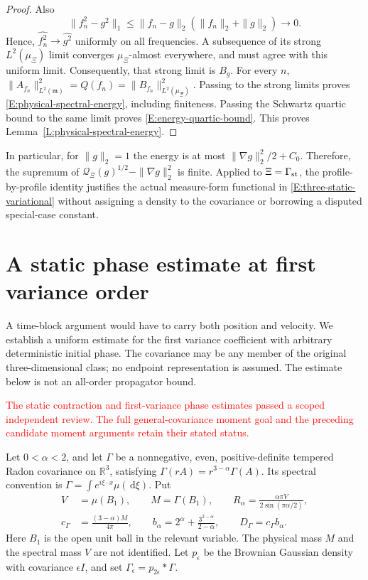 \documentclass[12pt]{article}
\numberwithin{equation}{section}
\theoremstyle{definition}
\newcommand{\R}{\mathbb{R}}
\newcommand{\ud}{\,\mathrm{d}}
\newcommand{\myCmts}[1]{\begin{framed}\noindent\textcolor{red}{#1}\end{framed}}
\begin{document}
\begin{proof}
  Also
  \[
    \|f_n^2-g^2\|_1
    \le\|f_n-g\|_2(\|f_n\|_2+\|g\|_2)\longrightarrow0.
  \]
  Hence, $\widehat{f_n^2}\to\widehat{g^2}$ uniformly on all
  frequencies. A subsequence of its strong $L^2(\mu_\Xi)$ limit
  converges $\mu_\Xi$-almost everywhere, and must agree with this
  uniform limit. Consequently, that strong limit is $B_g$.
  For every $n$,
  $\|A_{f_n}\|_{L^2(\mathfrak m)}^2
  =Q(f_n)=\|B_{f_n}\|_{L^2(\mu_\Xi)}^2$.
  Passing to the strong limits proves
  \eqref{E:physical-spectral-energy}, including finiteness.
  Passing the Schwartz quartic bound to the same limit proves
  \eqref{E:energy-quartic-bound}.
  This proves Lemma~\ref{L:physical-spectral-energy}.
\end{proof}

In particular, for $\|g\|_2=1$ the energy is at most
$\|\nabla g\|_2^2/2+C_0$. Therefore, the supremum of
$\mathcal Q_\Xi(g)^{1/2}-\|\nabla g\|_2^2$ is finite.
Applied to $\Xi=\Gamma_{\rm st}$, the profile-by-profile identity
justifies the actual measure-form functional in
\eqref{E:three-static-variational} without assigning a density to
the covariance or borrowing a disputed special-case constant.

\section{A static phase estimate at first variance order}
\label{S:static-phase}

A time-block argument would have to carry both position and velocity.
We establish a uniform estimate for the first variance coefficient with
arbitrary deterministic initial phase. The covariance may be any member
of the original three-dimensional class; no endpoint representation is
assumed. The estimate below is not an all-order propagator bound.

\myCmts{The static contraction and first-variance phase estimates
passed a scoped independent review.
The full general-covariance moment goal and the preceding candidate
moment arguments retain their stated status.}

Let $0<\alpha<2$, and let $\Gamma$ be a nonnegative, even,
positive-definite tempered Radon covariance on $\R^3$, satisfying
$\Gamma(rA)=r^{3-\alpha}\Gamma(A)$. Its spectral convention is
$\Gamma=\int e^{i\xi\cdot x}\mu(\ud\xi)$. Put
\begin{equation}\label{E:phase-constants}
  \begin{split}
    V&=\mu(B_1),\qquad M=\Gamma(B_1),\qquad
    R_\alpha=\frac{\alpha\pi V}{2\sin(\pi\alpha/2)},\\
    c_\Gamma&=\frac{(3-\alpha)M}{4\pi},\qquad
    b_\alpha=2^\alpha+\frac{3^{2-\alpha}}{2-\alpha},\qquad
    D_\Gamma=c_\Gamma b_\alpha.
  \end{split}
\end{equation}
Here $B_1$ is the open unit ball in the relevant variable.
The physical mass $M$ and the spectral mass $V$ are not identified.
Let $p_\epsilon$ be the Brownian Gaussian density with covariance
$\epsilon I$, and set
$\Gamma_\epsilon=p_{2\epsilon}*\Gamma$.
\end{document}
